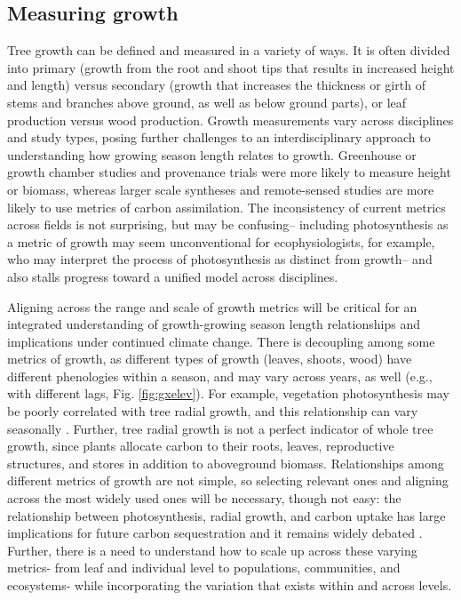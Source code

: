 \documentclass[11pt]{article}
\begin{document}
\subsection*{Measuring growth}

Tree growth can be defined and measured in a variety of ways. It is often divided into primary (growth from the root and shoot tips that results in increased height and length) versus secondary (growth that increases the thickness or girth of stems and branches above ground, as well as below ground parts), or leaf production versus wood production.  
Growth measurements vary across disciplines and study types, posing further challenges to an interdisciplinary approach to understanding how growing season length relates to growth. 
Greenhouse or growth chamber studies and provenance trials were more likely to measure height or biomass, whereas larger scale syntheses and remote-sensed studies are more likely to use metrics of carbon assimilation. 
The inconsistency of current metrics across fields is not surprising, but may be confusing-- including photosynthesis as a metric of growth may seem unconventional for ecophysiologists, for example, who may interpret the process of photosynthesis as distinct from growth-- and also stalls progress toward a unified model across disciplines.

Aligning across the range and scale of growth metrics will be critical for an integrated understanding of growth-growing season length relationships and implications under continued climate change.  
There is decoupling among some metrics of growth, as different types of growth (leaves, shoots, wood) have different phenologies within a season, and may vary across years, as well (e.g., with different lags, Fig. \ref{fig:gxelev}).
For example, vegetation photosynthesis may be poorly correlated with tree radial growth, and this relationship can vary seasonally \citep{cabon2022cross}. 
Further, tree radial growth is not a perfect indicator of whole tree growth, since plants allocate carbon to their roots, leaves, reproductive structures, and stores in addition to aboveground biomass. 
Relationships among different metrics of growth are not simple, so selecting relevant ones and aligning across the most widely used ones will be necessary, though not easy: the relationship  between photosynthesis, radial growth, and carbon uptake has large implications for future carbon sequestration and it remains widely debated \citep{green2022limits}. 
Further, there is a need to understand how to scale up across these varying metrics- from leaf and individual level to populations, communities, and ecosystems- while incorporating the variation that exists within and across levels.
\end{document}
